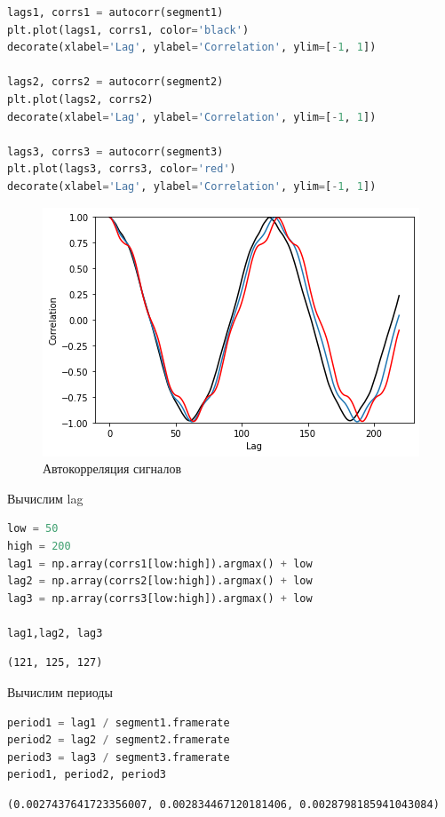 \begin{lstlisting}[language=Python]
lags1, corrs1 = autocorr(segment1)
plt.plot(lags1, corrs1, color='black')
decorate(xlabel='Lag', ylabel='Correlation', ylim=[-1, 1])

lags2, corrs2 = autocorr(segment2)
plt.plot(lags2, corrs2)
decorate(xlabel='Lag', ylabel='Correlation', ylim=[-1, 1])

lags3, corrs3 = autocorr(segment3)
plt.plot(lags3, corrs3, color='red')
decorate(xlabel='Lag', ylabel='Correlation', ylim=[-1, 1])
\end{lstlisting}
\begin{figure}[H]
	\begin{center}
		\includegraphics[scale=1]{fig/lab05/lab05_2.png}
		\caption{Автокорреляция сигналов}
	\end{center}
\end{figure}

Вычислим lag

\begin{lstlisting}[language=Python]
low = 50
high = 200
lag1 = np.array(corrs1[low:high]).argmax() + low
lag2 = np.array(corrs2[low:high]).argmax() + low
lag3 = np.array(corrs3[low:high]).argmax() + low

lag1,lag2, lag3
\end{lstlisting}
\begin{lstlisting}
(121, 125, 127)
\end{lstlisting}

Вычислим периоды

\begin{lstlisting}[language=Python]
period1 = lag1 / segment1.framerate
period2 = lag2 / segment2.framerate
period3 = lag3 / segment3.framerate
period1, period2, period3
\end{lstlisting}
\begin{lstlisting}
(0.0027437641723356007, 0.002834467120181406, 0.0028798185941043084)
\end{lstlisting}


